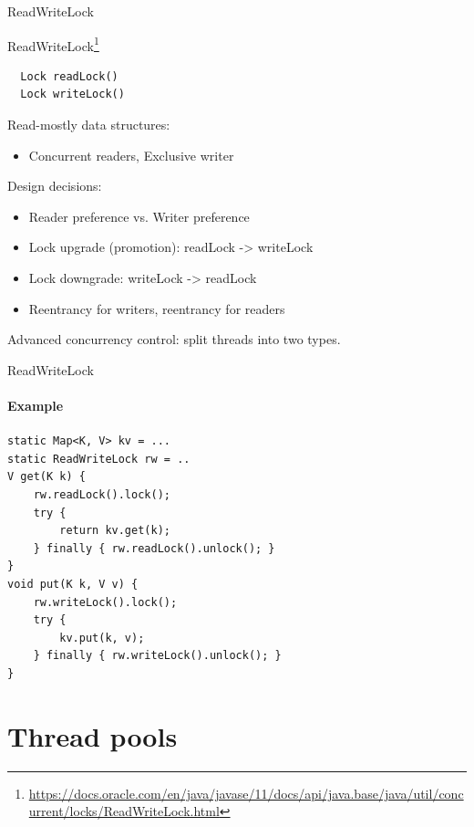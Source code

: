 
\begin{frame}{ReadWriteLock}

ReadWriteLock\footnote{\tiny\url{https://docs.oracle.com/en/java/javase/11/docs/api/java.base/java/util/concurrent/locks/ReadWriteLock.html}}

\begin{verbatim}
  Lock readLock()
  Lock writeLock()
\end{verbatim}

Read-mostly data structures:
\begin{itemize}
    \item Concurrent readers, Exclusive writer
\end{itemize}

Design decisions:
\begin{itemize}
    \item Reader preference vs. Writer preference

    \item Lock upgrade (promotion): readLock -> writeLock

    \item Lock downgrade: writeLock -> readLock

    \item Reentrancy for writers, reentrancy for readers
\end{itemize}

Advanced concurrency control: split threads into two types.
\end{frame}


\begin{frame}[fragile]{ReadWriteLock}
\framesubtitle{Example}

\begin{verbatim}
static Map<K, V> kv = ...
static ReadWriteLock rw = ..
V get(K k) {
    rw.readLock().lock();
    try {
        return kv.get(k);
    } finally { rw.readLock().unlock(); }
}
void put(K k, V v) {
    rw.writeLock().lock();
    try {
        kv.put(k, v);
    } finally { rw.writeLock().unlock(); }
}
\end{verbatim}
\end{frame}


\section{Thread pools}
\showTOC

